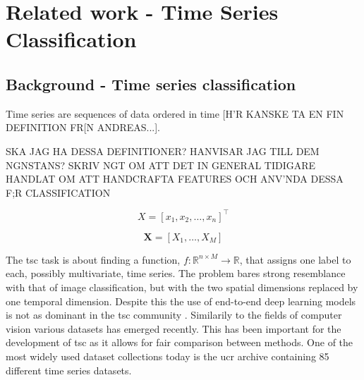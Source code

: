 \chapter{Related work - Time Series Classification} \label{sec:tsc} \label{ch:tsc}
\section{Background - Time series classification}
Time series are sequences of data ordered in time [H'R KANSKE TA EN FIN DEFINITION FR[N ANDREAS...].

SKA JAG HA DESSA DEFINITIONER? HANVISAR JAG TILL DEM NGNSTANS?
SKRIV NGT OM ATT DET IN GENERAL TIDIGARE HANDLAT OM ATT HANDCRAFTA FEATURES OCH ANV'NDA DESSA F;R CLASSIFICATION

\begin{definition}
  $$X = \left[x_1, x_2, \hdots, x_n\right]^\intercal$$
  \label{def:uts}
\end{definition}

\begin{definition}
    $$\pmb{X} = \left[X_1, \hdots, X_M\right]$$
\end{definition}

The \gls{tsc} task is about finding a function, $f: \mathbb{R}^{n \times M} \rightarrow \mathbb{R}$, that assigns one label to each, possibly multivariate, time series. The problem bares strong resemblance with that of image classification, but with the two spatial dimensions replaced by one temporal dimension. Despite this the use of end-to-end deep learning models is not as dominant in the \gls{tsc} community \cite{IsmailFawaz2019}. Similarily to the fields of computer vision various datasets has emerged recently. This has been important for the development of \gls{tsc} as it allows for fair comparison between methods. One of the most widely used dataset collections today is the \gls{ucr} archive \cite{Dau2018} containing 85 different time series datasets.


